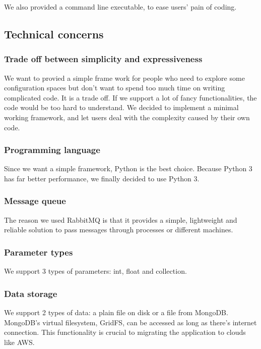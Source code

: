 \documentclass{article}
\begin{document}
    We also provided a command line executable, to ease users' pain of coding.

    \subsection{Technical concerns}

        \subsubsection{Trade off between simplicity and expressiveness}
        We want to provied a simple frame work for people who need to explore some configuration spaces but don't want to spend too much time on writing complicated code.
        It is a trade off.
        If we support a lot of fancy functionalities, the code would be too hard to understand.
        We decided to implement a minimal working framework, and let users deal with the complexity caused by their own code.

        \subsubsection{Programming language}
        Since we want a simple framework, Python is the best choice.
        Because Python 3 has far better performance, we finally decided to use Python 3.

        \subsubsection{Message queue}
        The reason we used RabbitMQ is that it provides a simple, lightweight and reliable solution to pass messages through processes or different machines.

        \subsubsection{Parameter types}
        We support 3 types of parameters: int, float and collection.

        \subsubsection{Data storage}
        We support 2 types of data: a plain file on disk or a file from MongoDB.
        MongoDB's virtual filesystem, GridFS, can be accessed as long as there's internet connection.
        This functionality is crucial to migrating the application to clouds like AWS.
\end{document}
